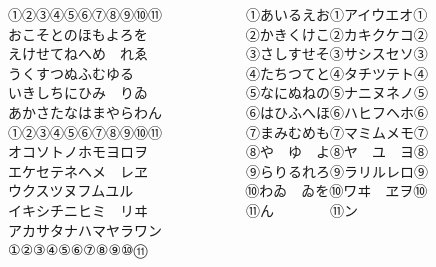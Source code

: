 ①②③④⑤⑥⑦⑧⑨⑩⑪　　　　　　①あいるえお①アイウエオ①\\
おこそとのほもよろを　　　　　　　②かきくけこ②カキクケコ②\\
えけせてねへめ　れゑ　　　　　　　③さしすせそ③サシスセソ③\\
うくすつぬふむゆる　　　　　　　　④たちつてと④タチツテト④\\
いきしちにひみ　りゐ　　　　　　　⑤なにぬねの⑤ナニヌネノ⑤\\
あかさたなはまやらわん　　　　　　⑥はひふへほ⑥ハヒフヘホ⑥\\
①②③④⑤⑥⑦⑧⑨⑩⑪　　　　　　⑦まみむめも⑦マミムメモ⑦\\
オコソトノホモヨロヲ　　　　　　　⑧や　ゆ　よ⑧ヤ　ユ　ヨ⑧\\
エケセテネヘメ　レヱ　　　　　　　⑨らりるれろ⑨ラリルレロ⑨\\
ウクスツヌフムユル　　　　　　　　⑩わゐ　ゐを⑩ワヰ　ヱヲ⑩\\
イキシチニヒミ　リヰ　　　　　　　⑪ん　　　　⑪ン　　　　　\\
アカサタナハマヤラワン　　　　　　　　　　　　　　　　　　　\\
①②③④⑤⑥⑦⑧⑨⑩⑪　　　　　　　　　　　　　　　　　　　\\

